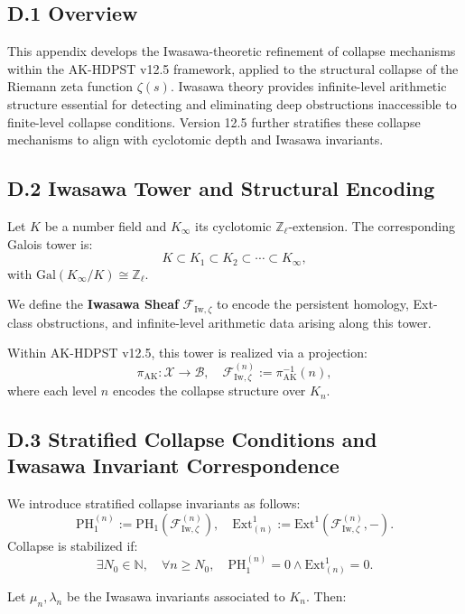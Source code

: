 \documentclass[11pt]{article}
\begin{document}
\subsection*{D.1 Overview}

This appendix develops the Iwasawa-theoretic refinement of collapse mechanisms within the AK-HDPST v12.5 framework, applied to the structural collapse of the Riemann zeta function $\zeta(s)$. Iwasawa theory provides infinite-level arithmetic structure essential for detecting and eliminating deep obstructions inaccessible to finite-level collapse conditions. Version 12.5 further stratifies these collapse mechanisms to align with cyclotomic depth and Iwasawa invariants.

\subsection*{D.2 Iwasawa Tower and Structural Encoding}

Let $K$ be a number field and $K_\infty$ its cyclotomic $\mathbb{Z}_\ell$-extension. The corresponding Galois tower is:
\[
K \subset K_1 \subset K_2 \subset \cdots \subset K_\infty,
\]
with $\mathrm{Gal}(K_\infty/K) \cong \mathbb{Z}_\ell$.

We define the \textbf{Iwasawa Sheaf} $\mathcal{F}_{\mathrm{Iw}, \zeta}$ to encode the persistent homology, Ext-class obstructions, and infinite-level arithmetic data arising along this tower.

Within AK-HDPST v12.5, this tower is realized via a projection:
\[
\pi_{\mathrm{AK}} : \mathcal{X} \longrightarrow \mathcal{B}, \quad \mathcal{F}_{\mathrm{Iw}, \zeta}^{(n)} := \pi_{\mathrm{AK}}^{-1}(n),
\]
where each level $n$ encodes the collapse structure over $K_n$.

\subsection*{D.3 Stratified Collapse Conditions and Iwasawa Invariant Correspondence}

We introduce stratified collapse invariants as follows:
\[
\mathrm{PH}_1^{(n)} := \mathrm{PH}_1(\mathcal{F}_{\mathrm{Iw}, \zeta}^{(n)}), \quad 
\mathrm{Ext}^1_{(n)} := \mathrm{Ext}^1(\mathcal{F}_{\mathrm{Iw}, \zeta}^{(n)}, -).
\]
Collapse is stabilized if:
\[
\exists N_0 \in \mathbb{N}, \quad \forall n \geq N_0, \quad 
\mathrm{PH}_1^{(n)} = 0 \wedge \mathrm{Ext}^1_{(n)} = 0.
\]

Let $\mu_n, \lambda_n$ be the Iwasawa invariants associated to $K_n$. Then:
\end{document}
